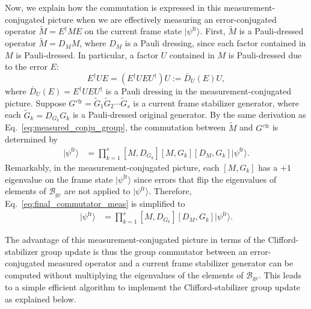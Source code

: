 \documentclass[
 reprint,
 amsmath,amssymb,
 pra,superscriptaddress, nofootinbib
]{revtex4-2}
\theoremstyle{definition}
\theoremstyle{plain}
\begin{document}
Now, we explain how the commutation is expressed in this measurement-conjugated picture when we are effectively measuring an error-conjugated operator $\tilde M=E^\dagger ME$ on the current frame state $|\psi^\mathrm{fr} \rangle$.
First, $\tilde M$ is a Pauli-dressed operator $\tilde M=D_M M$, where $D_M$ is a Pauli dressing, since each factor contained in $M$ is Pauli-dressed. In particular, a factor $U$ contained in $M$ is Pauli-dressed due to the error $E$:
\begin{equation}
  E^\dagger UE = \left(E^\dagger UE U^\dagger \right) U:=\bar{D}_U(E)U,
  \label{eq:dressed_factor_meas}
\end{equation}
where $\bar{D}_U(E)=E^\dagger UE U^\dagger$ is a Pauli dressing in the measurement-conjugated picture.
Suppose ${ G'{^\mathrm{fr}}=\tilde G_1\tilde G_2\cdots \tilde G_s}$ is a current frame stabilizer generator, where each $\tilde G_k=D_{G_k}G_k$ is a Pauli-dressed original generator.
By the same derivation as Eq.~\eqref{eq:measured_conju_group}, the commutation between $\tilde M$ and $G'{^\mathrm{fr}}$ is determined by
\begin{align}
  [\tilde M,
    G'{^\mathrm{fr}}]|\psi^\mathrm{fr} \rangle
&=
  \prod_{k=1}^{s}
  [M,D_{G_k}][M,G_k][D_M,G_k]|\psi^\mathrm{fr} \rangle.
  \label{eq:final_commutator_meas}
\end{align}
Remarkably, in the measurement-conjugated picture, each $[M,G_k]$ has a $+1$ eigenvalue on the frame state $|\psi^\mathrm{fr} \rangle$ since errors that flip the eigenvalues of elements of $\mathcal{B}_{\mathrm{gc}}$ are not applied to $|\psi^\mathrm{fr} \rangle$.
Therefore, Eq.~\eqref{eq:final_commutator_meas} is simplified to 
\begin{align}
  [\tilde M,
    G'{^\mathrm{fr}}]|\psi^\mathrm{fr} \rangle
&=
  \prod_{k=1}^{s}
  [M,D_{G_k}][D_M,G_k]|\psi^\mathrm{fr} \rangle.
  \label{eq:final_commutator_meas_simple}
\end{align}

The advantage of this measurement-conjugated picture in terms of the Clifford-stabilizer group update is thus the group commutator between an error-conjugated measured operator and a current frame stabilizer generator can be computed without multiplying the eigenvalues of the elements of $\mathcal{B}_\mathrm{gc}$.
This leads to a simple efficient algorithm to implement the Clifford-stabilizer group update as explained below.
\end{document}
